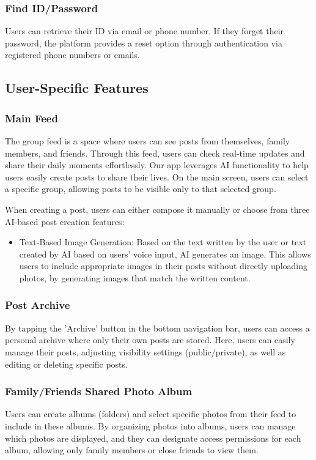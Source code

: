 \documentclass[conference]{IEEEtran}
\begin{document}
        \subsubsection{Find ID/Password}
            Users can retrieve their ID via email or phone number. If they forget their password, the platform provides a reset option through authentication via registered phone numbers or emails.

    \subsection{User-Specific Features}
        \subsubsection{Main Feed}
            The group feed is a space where users can see posts from themselves, family members, and friends. Through this feed, users can check real-time updates and share their daily moments effortlessly. Our app leverages AI functionality to help users easily create posts to share their lives. On the main screen, users can select a specific group, allowing posts to be visible only to that selected group.

            When creating a post, users can either compose it manually or choose from three AI-based post creation features:
            \begin{itemize}
                \item Text-Based Image Generation: Based on the text written by the user or text created by AI based on users' voice input, AI generates an image. This allows users to include appropriate images in their posts without directly uploading photos, by generating images that match the written content.
            \end{itemize}

        \subsubsection{Post Archive}
            By tapping the 'Archive' button in the bottom navigation bar, users can access a personal archive where only their own posts are stored. Here, users can easily manage their posts, adjusting visibility settings (public/private), as well as editing or deleting specific posts.

        \subsubsection{Family/Friends Shared Photo Album}
            Users can create albums (folders) and select specific photos from their feed to include in these albums. By organizing photos into albums, users can manage which photos are displayed, and they can designate access permissions for each album, allowing only family members or close friends to view them.
\end{document}
